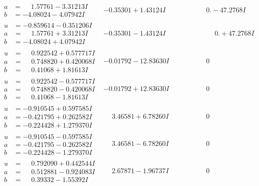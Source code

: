 \documentclass[1p]{elsarticle_modified}
\theoremstyle{definition}
\begin{document}
$$\begin{array}{c|c|c}
\begin{aligned}
a &= \phantom{-}1.57761 - 3.31213 I \\
b &= -4.08024 - 4.07942 I\end{aligned}
 & -0.35301 + 1.43124 I & \phantom{-0.000000 } 0. - 47.2768 I \\ \hline\begin{aligned}
u &= -0.859614 - 0.351206 I \\
a &= \phantom{-}1.57761 + 3.31213 I \\
b &= -4.08024 + 4.07942 I\end{aligned}
 & -0.35301 - 1.43124 I & \phantom{-0.000000 -}0. + 47.2768 I \\ \hline\begin{aligned}
u &= \phantom{-}0.922542 + 0.577717 I \\
a &= \phantom{-}0.748820 + 0.420068 I \\
b &= \phantom{-}0.41068 + 1.81613 I\end{aligned}
 & -0.01792 - 12.83630 I & \phantom{-0.000000 } 0 \\ \hline\begin{aligned}
u &= \phantom{-}0.922542 - 0.577717 I \\
a &= \phantom{-}0.748820 - 0.420068 I \\
b &= \phantom{-}0.41068 - 1.81613 I\end{aligned}
 & -0.01792 + 12.83630 I & \phantom{-0.000000 } 0 \\ \hline\begin{aligned}
u &= -0.910545 + 0.597585 I \\
a &= -0.421795 + 0.262582 I \\
b &= -0.224428 + 1.279370 I\end{aligned}
 & \phantom{-}3.46581 + 6.78260 I & \phantom{-0.000000 } 0 \\ \hline\begin{aligned}
u &= -0.910545 - 0.597585 I \\
a &= -0.421795 - 0.262582 I \\
b &= -0.224428 - 1.279370 I\end{aligned}
 & \phantom{-}3.46581 - 6.78260 I & \phantom{-0.000000 } 0 \\ \hline\begin{aligned}
u &= \phantom{-}0.792090 + 0.442544 I \\
a &= \phantom{-}0.512881 - 0.924083 I \\
b &= \phantom{-}0.39332 - 1.55392 I\end{aligned}
 & \phantom{-}2.67871 - 1.96737 I & \phantom{-0.000000 } 0 \\ \hline\begin{aligned}

\end{aligned}
\end{array}$$
\end{document}
